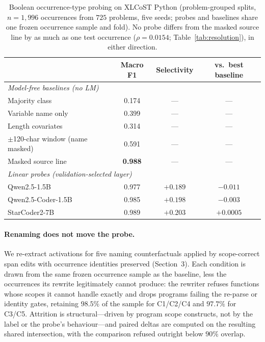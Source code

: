 \begin{table}[t]
\centering
\caption{Boolean occurrence-type probing on XLCoST Python
(problem-grouped splits, $n{=}1{,}996$ occurrences from $725$ problems,
five seeds; probes and baselines share one frozen occurrence sample and
fold). No probe differs from the masked source line by as much as one test
occurrence ($\rho = 0.0154$; Table~\ref{tab:resolution}), in either
direction.}
\label{tab:boolean-baselines}
\begin{tabular}{lccc}
\toprule
 & Macro F1 & Selectivity & vs.\ best baseline \\
\midrule
\multicolumn{4}{l}{\textit{Model-free baselines (no LM)}} \\
Majority class                     & 0.174 & --- & --- \\
Variable name only                 & 0.399 & --- & --- \\
Length covariates                  & 0.314 & --- & --- \\
$\pm$120-char window (name masked) & 0.591 & --- & --- \\
Masked source line                 & \textbf{0.988} & --- & --- \\
\midrule
\multicolumn{4}{l}{\textit{Linear probes (validation-selected layer)}} \\
Qwen2.5-1.5B                       & 0.977 & $+0.189$ & $-0.011$ \\
Qwen2.5-Coder-1.5B                 & 0.985 & $+0.198$ & $-0.003$ \\
StarCoder2-7B                      & 0.989 & $+0.203$ & $+0.0005$ \\
\bottomrule
\end{tabular}
\end{table}

\paragraph{Renaming does not move the probe.} We re-extract activations
for five naming counterfactuals applied by scope-correct span edits with
occurrence identities preserved (Section~3). Each condition is drawn from
the same frozen occurrence sample as the baseline, less the occurrences
its rewrite legitimately cannot produce: the rewriter refuses functions
whose scopes it cannot handle exactly and drops programs failing the
re-parse or identity gates, retaining $98.5\%$ of the sample for C1/C2/C4
and $97.7\%$ for C3/C5. Attrition is structural---driven by program scope
constructs, not by the label or the probe's behaviour---and paired deltas
are computed on the resulting shared intersection, with the comparison
refused outright below $90\%$ overlap.

